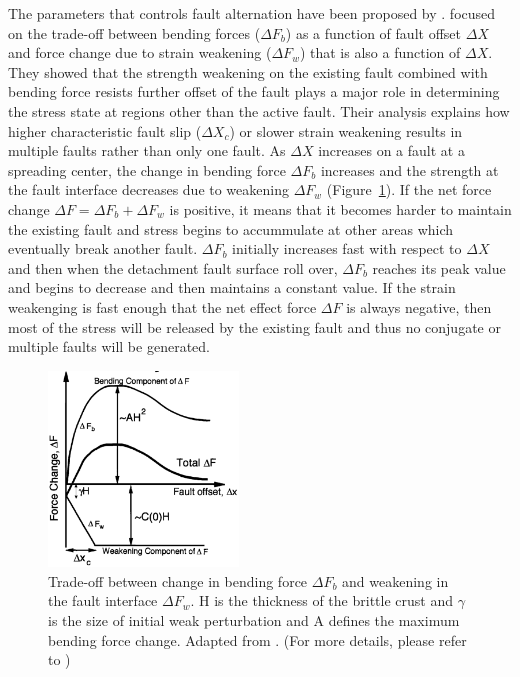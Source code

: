 The parameters that controls fault alternation have been proposed by \citet{Lavier2000}. \citet{Lavier2000} focused on the trade-off between bending forces ($\Delta F_{b}$) as a function of fault offset $\Delta X$ and force change due to strain weakening ($\Delta F_{w}$) that is also a function of  $\Delta X$. They showed that the strength weakening on the existing fault combined with bending force resists further offset of the fault plays a major role in determining the stress state at regions other than the active fault. Their analysis explains how higher characteristic fault slip ($\Delta X_{c}$) or slower strain weakening results in multiple faults rather than only one fault. %
 As $\Delta X$ increases on a fault at a spreading center, the change in bending force $\Delta F_{b}$ increases and the strength at the fault interface decreases due to weakening $\Delta F_{w}$ (Figure~\hyperref[fig_Results_Weakening_1]{\ref{fig_Results_Weakening_1}}). If the net force change $\Delta F = \Delta F_{b}+ \Delta F_{w}$ is positive, it means that it becomes harder to maintain the existing fault and stress begins to accummulate at other areas which eventually break another fault. $\Delta F_{b}$ initially increases fast with respect to $\Delta X$ and then when the detachment fault surface roll over, $\Delta F_{b}$ reaches its peak value and begins to decrease and then maintains a constant value. If the strain weakenging is fast enough that the net effect force $\Delta F$ is always negative, then most of the stress will be released by the existing fault and thus no conjugate or multiple faults will be generated. 

\begin{figure}[h]
 \centering
  \includegraphics[width=0.45\textwidth]{./Figures/fig_Results_Weakening_1_tradeOff_bend_weak.png}
 \caption[Trade-off between change in bending force $\Delta F_{b}$ and weakening in the fault interface $\Delta F_{w}$. Adapted from \citep{Lavier2000}.]{Trade-off between change in bending force $\Delta F_{b}$ and weakening in the fault interface $\Delta F_{w}$. H is the thickness of the brittle crust and $\gamma$ is the size of initial weak perturbation and A defines the maximum bending force change. Adapted from \citep{Lavier2000}. (For more details, please refer to \citep{Lavier2000})}
 \label{fig_Results_Weakening_1}
\end{figure}

